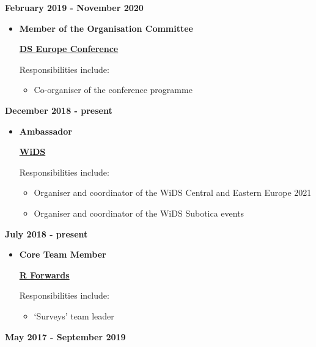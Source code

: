 \documentclass[
]{article}
\providecommand{\tightlist}{%
  \setlength{\itemsep}{0pt}\setlength{\parskip}{0pt}}
\begin{document}
\textbf{February 2019 - November 2020}

\begin{itemize}
\item
  \textbf{Member of the Organisation Committee}

  \href{https://datasciconference.com/}{\textbf{DS Europe Conference}}

  Responsibilities include:

  \begin{itemize}
  \tightlist
  \item
    Co-organiser of the conference programme
  \end{itemize}
\end{itemize}

\textbf{December 2018 - present}

\begin{itemize}
\item
  \textbf{Ambassador}

  \href{https://www.widsconference.org/}{\textbf{WiDS}}

  Responsibilities include:

  \begin{itemize}
  \item
    Organiser and coordinator of the WiDS Central and Eastern Europe
    2021
  \item
    Organiser and coordinator of the WiDS Subotica events
  \end{itemize}
\end{itemize}

\textbf{July 2018 - present}

\begin{itemize}
\item
  \textbf{Core Team Member}

  \href{https://forwards.github.io/}{\textbf{R Forwards}}

  Responsibilities include:

  \begin{itemize}
  \tightlist
  \item
    `Surveys' team leader
  \end{itemize}
\end{itemize}

\textbf{May 2017 - September 2019}
\end{document}
